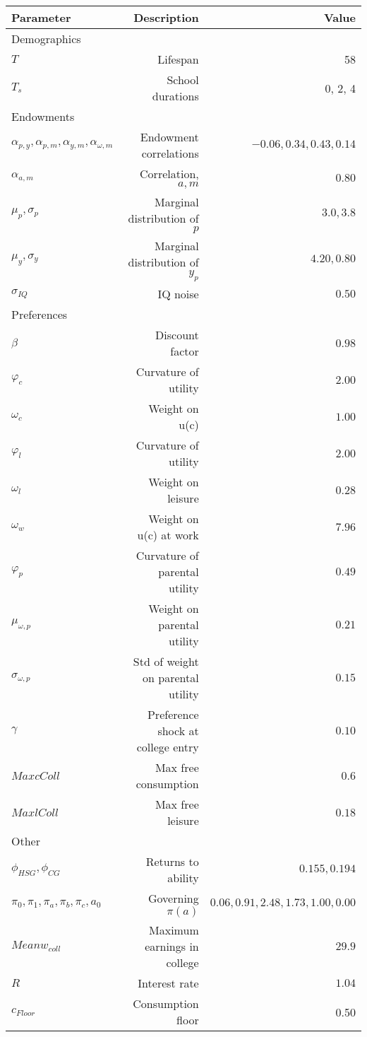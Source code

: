\begin{tabular}{lrr}
\hline
Parameter & Description  & Value  \\
\hline
Demographics &   &   \\
$T$ & Lifespan  & 58  \\
$T_{s}$ & School durations  & 0, 2, 4  \\
Endowments &   &   \\
$\alpha_{p,y}, \alpha_{p,m}, \alpha_{y,m}, \alpha_{\omega,m}$ & Endowment correlations  & $-0.06, 0.34, 0.43, 0.14$  \\
$\alpha_{a,m}$ & Correlation, $a,m$  & $0.80$  \\
$\mu_{p}, \sigma_{p}$ & Marginal distribution of $p$  & $3.0, 3.8$  \\
$\mu_{y}, \sigma_{y}$ & Marginal distribution of $y_{p}$  & $4.20, 0.80$  \\
$\sigma_{IQ}$ & IQ noise  & $0.50$  \\
Preferences &   &   \\
$\beta$ & Discount factor  & $0.98$  \\
$\varphi_{c}$ & Curvature of utility  & $2.00$  \\
$\omega_{c}$ & Weight on u(c)  & $1.00$  \\
$\varphi_{l}$ & Curvature of utility  & $2.00$  \\
$\omega_{l}$ & Weight on leisure  & $0.28$  \\
$\omega_{w}$ & Weight on u(c) at work  & $7.96$  \\
$\varphi_{p}$ & Curvature of parental utility  & $0.49$  \\
$\mu_{\omega,p}$ & Weight on parental utility  & $0.21$  \\
$\sigma_{\omega,p}$ & Std of weight on parental utility  & $0.15$  \\
$\gamma$ & Preference shock at college entry  & $0.10$  \\
$Max cColl$ & Max free consumption  & $0.6$  \\
$Max lColl$ & Max free leisure  & $0.18$  \\
Other &   &   \\
$\phi_{HSG}, \phi_{CG}$ & Returns to ability  & $0.155, 0.194$  \\
$\pi_{0}, \pi_{1}, \pi_{a}, \pi_{b}, \pi_{c}, a_{0}$ & Governing $\pi(a)$  & $0.06, 0.91, 2.48, 1.73, 1.00, 0.00$  \\
$Mean w_{coll}$ & Maximum earnings in college  & $29.9$  \\
$R$ & Interest rate  & $1.04$  \\
$c_{Floor}$ & Consumption floor  & 0.50  \\
\hline
\end{tabular}%
